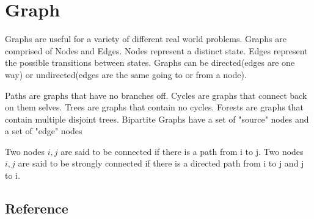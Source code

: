 \section{Graph}
Graphs are useful for a variety of different real world problems.
Graphs are comprised of Nodes and Edges.
Nodes represent a distinct state.
Edges represent the possible transitions between states.
Graphs can be directed(edges are one way) or undirected(edges are the same going to or from a node).

Paths are graphs that have no branches off.
Cycles are graphs that connect back on them selves.
Trees are graphs that contain no cycles.
Forests are graphs that contain multiple disjoint trees.
Bipartite Graphs have a set of "source" nodes and a set of "edge" nodes

Two nodes $i,j$ are said to be connected if there is a path from i to j.
Two nodes $i,j$ are said to be strongly connected if there is a directed path from i to j and j to i.

\subsection{Reference}

